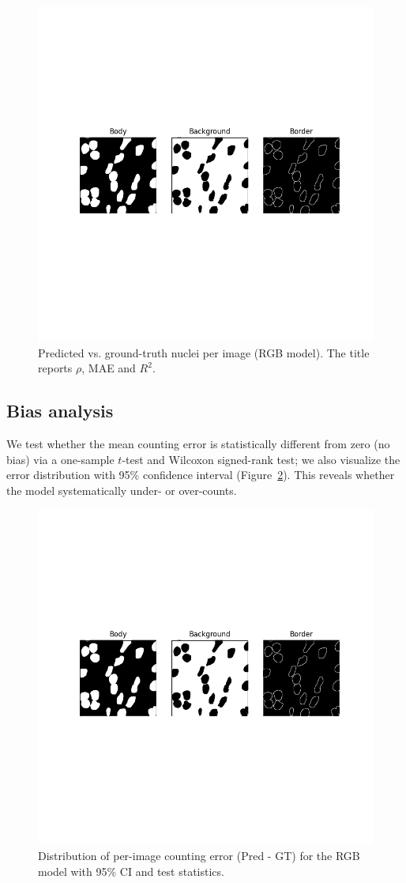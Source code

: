 \documentclass[target=bach,aauheader=,style=]{thud}
\begin{document}
\begin{figure}[ht]
    \centering
    \includegraphics[width=.55\linewidth]{imgs/3ch_binarymask.png}
    \caption{Predicted vs. ground-truth nuclei per image (RGB model). The title reports $\rho$, MAE and $R^2$.}
    \label{fig:scatter}
\end{figure}

\subsection{Bias analysis}
We test whether the mean counting error is statistically different from zero (no bias) via a one-sample $t$-test and Wilcoxon signed-rank test; we also visualize the error distribution with 95\% confidence interval (Figure~\ref{fig:bias-hist}). 
This reveals whether the model systematically under- or over-counts.

\begin{figure}[ht]
    \centering
    \includegraphics[width=.6\linewidth]{imgs/3ch_binarymask.png}
    \caption{Distribution of per-image counting error (Pred - GT) for the RGB model with 95\% CI and test statistics.}
    \label{fig:bias-hist}
\end{figure}
\end{document}
